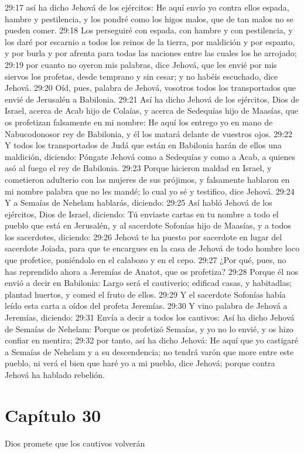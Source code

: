 29:17 así ha dicho Jehová de los ejércitos: He aquí envío yo contra ellos espada, hambre y pestilencia, y los pondré como los higos malos, que de tan malos no se pueden comer. 
29:18 Los perseguiré con espada, con hambre y con pestilencia, y los daré por escarnio a todos los reinos de la tierra, por maldición y por espanto, y por burla y por afrenta para todas las naciones entre las cuales los he arrojado; 
29:19 por cuanto no oyeron mis palabras, dice Jehová, que les envié por mis siervos los profetas, desde temprano y sin cesar; y no habéis escuchado, dice Jehová. 
29:20 Oíd, pues, palabra de Jehová, vosotros todos los transportados que envié de Jerusalén a Babilonia. 
29:21 Así ha dicho Jehová de los ejércitos, Dios de Israel, acerca de Acab hijo de Colaías, y acerca de Sedequías hijo de Maasías, que os profetizan falsamente en mi nombre: He aquí los entrego yo en mano de Nabucodonosor rey de Babilonia, y él los matará delante de vuestros ojos. 
29:22 Y todos los transportados de Judá que están en Babilonia harán de ellos una maldición, diciendo: Póngate Jehová como a Sedequías y como a Acab, a quienes asó al fuego el rey de Babilonia. 
29:23 Porque hicieron maldad en Israel, y cometieron adulterio con las mujeres de sus prójimos, y falsamente hablaron en mi nombre palabra que no les mandé; lo cual yo sé y testifico, dice Jehová. 
29:24 Y a Semaías de Nehelam hablarás, diciendo: 
29:25 Así habló Jehová de los ejércitos, Dios de Israel, diciendo: Tú enviaste cartas en tu nombre a todo el pueblo que está en Jerusalén, y al sacerdote Sofonías hijo de Maasías, y a todos los sacerdotes, diciendo: 
29:26 Jehová te ha puesto por sacerdote en lugar del sacerdote Joiada, para que te encargues en la casa de Jehová de todo hombre loco que profetice, poniéndolo en el calabozo y en el cepo. 
29:27 ¿Por qué, pues, no has reprendido ahora a Jeremías de Anatot, que os profetiza? 
29:28 Porque él nos envió a decir en Babilonia: Largo será el cautiverio; edificad casas, y habitadlas; plantad huertos, y comed el fruto de ellos. 
29:29 Y el sacerdote Sofonías había leído esta carta a oídos del profeta Jeremías. 
29:30 Y vino palabra de Jehová a Jeremías, diciendo: 
29:31 Envía a decir a todos los cautivos: Así ha dicho Jehová de Semaías de Nehelam: Porque os profetizó Semaías, y yo no lo envié, y os hizo confiar en mentira; 
29:32 por tanto, así ha dicho Jehová: He aquí que yo castigaré a Semaías de Nehelam y a su descendencia; no tendrá varón que more entre este pueblo, ni verá el bien que haré yo a mi pueblo, dice Jehová; porque contra Jehová ha hablado rebelión. 
\section*{Capítulo 30 }
Dios promete que los cautivos volverán 
 
